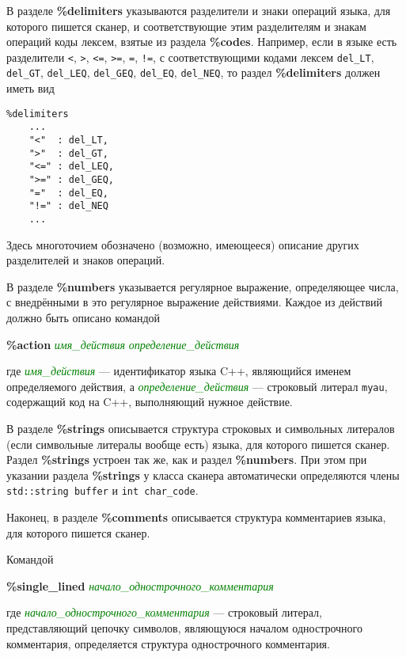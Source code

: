 \documentclass[10pt]{report}
\begin{document}
В разделе \textbf{\%delimiters} указываются разделители и знаки операций языка, для которого пишется сканер, и соответствующие этим разделителям и знакам
операций коды лексем, взятые из раздела \textbf{\%codes}. Например, если в языке есть разделители \texttt{<}, \texttt{>}, \texttt{<=}, \texttt{>=}, \texttt{=}, \texttt{!=},
с соответствующими кодами лексем \texttt{del_LT}, \texttt{del_GT}, \texttt{del_LEQ}, \texttt{del_GEQ}, \texttt{del_EQ}, \texttt{del_NEQ}, то раздел \textbf{\%delimiters}
должен иметь вид
\begin{verbatim}
%delimiters
    ...
    "<"  : del_LT,
    ">"  : del_GT,
    "<=" : del_LEQ,
    ">=" : del_GEQ,
    "="  : del_EQ,
    "!=" : del_NEQ
    ...
\end{verbatim} 
Здесь многоточием обозначено (возможно, имеющееся) описание других разделителей и знаков операций.

В разделе \textbf{\%numbers} указывается регулярное выражение, определяющее числа, с внедрёнными в это регулярное выражение действиями. Каждое из действий должно
быть описано командой

{\noindent%
\textbf{\%action} \textcolor{Green}{\textit{имя_действия}} \textcolor{Green}{\textit{определение_действия}}
}

\noindent%
где \textcolor{Green}{\textit{имя_действия}} --- идентификатор языка C++, являющийся именем определяемого действия, а \textcolor{Green}{\textit{определение_действия}} ---
строковый литерал \texttt{myau}, содержащий код на C++, выполняющий нужное действие.

В разделе \textbf{\%strings} описывается структура строковых и символьных литералов (если символьные литералы вообще есть) языка, для которого пишется сканер.
Раздел \textbf{\%strings} устроен так же, как и раздел \textbf{\%numbers}. При этом при указании раздела
\textbf{\%strings} у класса сканера автоматически определяются члены \texttt{std::string buffer} и \texttt{int char_code}.

Наконец, в разделе \textbf{\%comments} описывается структура комментариев языка, для которого пишется сканер.

Командой 

{\noindent%
\textbf{\%single_lined} \textcolor{Green}{\textit{начало_однострочного_комментария}}
}

\noindent%
где \textcolor{Green}{\textit{начало_однострочного_комментария}} --- строковый литерал, представляющий цепочку символов, являющуюся началом однострочного
комментария, определяется структура однострочного комментария.
\end{document}
